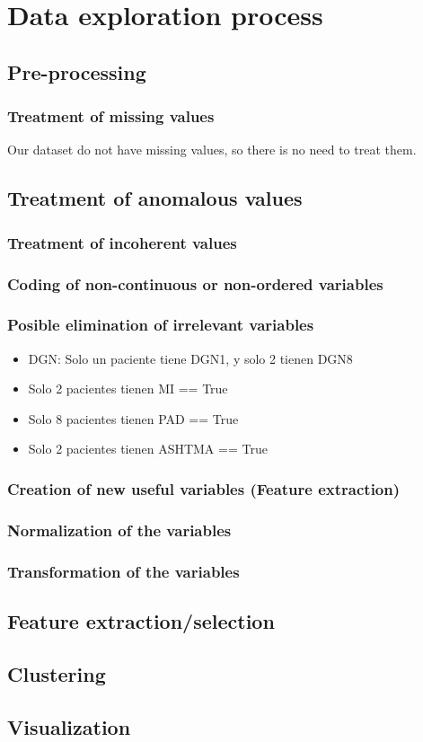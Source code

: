 \section{Data exploration process}

\subsection{Pre-processing}
\subsubsection{Treatment of missing values}
Our dataset do not have missing values, so there is no need to treat them.
\subsection{Treatment of anomalous values}
\subsubsection{Treatment of incoherent values}
\subsubsection{Coding of non-continuous or non-ordered variables}
\subsubsection{Posible elimination of irrelevant variables}
\begin{itemize}
  \item DGN: Solo un paciente tiene DGN1, y solo 2 tienen DGN8
  \item Solo 2 pacientes tienen MI == True
  \item Solo 8 pacientes tienen PAD == True
  \item Solo 2 pacientes tienen ASHTMA == True
\end{itemize}
\subsubsection{Creation of new useful variables (Feature extraction)}
\subsubsection{Normalization of the variables}
\subsubsection{Transformation of the variables}


\subsection{Feature extraction/selection}
\subsection{Clustering}
\subsection{Visualization}
